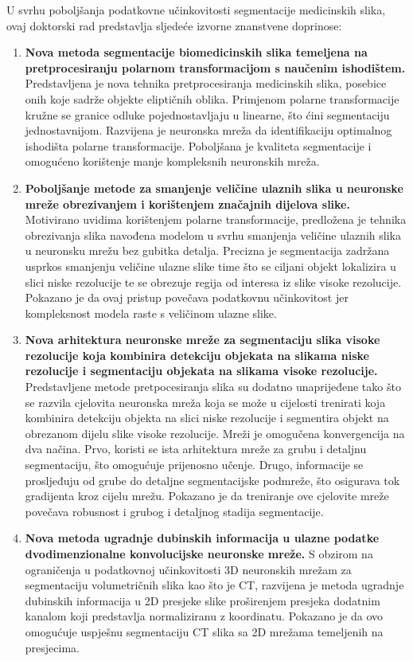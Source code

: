 U svrhu poboljšanja podatkovne učinkovitosti segmentacije medicinskih slika, ovaj doktorski rad predstavlja sljedeće izvorne znanstvene doprinose:

\begin{enumerate}
	\item \textbf{Nova metoda segmentacije biomedicinskih slika temeljena na pretprocesiranju polarnom transformacijom s naučenim ishodištem.} Predstavljena je nova tehnika pretprocesiranja medicinskih slika, posebice onih koje sadrže objekte eliptičnih oblika. Primjenom polarne transformacije kružne se granice odluke pojednostavljaju u linearne, što ćini segmentaciju jednostavnijom. Razvijena je neuronska mreža da identifikaciju optimalnog ishodišta polarne transformacije. Poboljšana je kvaliteta segmentacije i omogućeno korištenje manje kompleksnih neuronskih mreža.
	\item \textbf{Poboljšanje metode za smanjenje veličine ulaznih slika u neuronske mreže obrezivanjem i korištenjem značajnih dijelova slike.} Motivirano uvidima korištenjem polarne transformacije, predložena je tehnika obrezivanja slika navođena modelom u svrhu smanjenja veličine ulaznih slika u neuronsku mrežu bez gubitka detalja. Precizna je segmentacija zadržana usprkos smanjenju veličine ulazne slike time što se ciljani objekt lokalizira u slici niske rezolucije te se obrezuje regija od interesa iz slike visoke rezolucije. Pokazano je da ovaj pristup povečava podatkovnu učinkovitost jer kompleksnost modela raste s veličinom ulazne slike.
	\item \textbf{Nova arhitektura neuronske mreže za segmentaciju slika visoke rezolucije koja kombinira detekciju objekata na slikama niske rezolucije i segmentaciju objekata na slikama visoke rezolucije.} Predstavljene metode pretpocesiranja slika su dodatno unaprijeđene tako što se razvila cjelovita neuronska mreža koja se može u cijelosti trenirati koja kombinira detekciju objekta na slici niske rezolucije i segmentira objekt na obrezanom dijelu slike visoke rezolucije. Mreži je omogučena konvergencija na dva načina. Prvo, koristi se ista arhitektura mreže za grubu i detaljnu segmentaciju, što omogućuje prijenosno učenje. Drugo, informacije se prosljeđuju od grube do detaljne segmentacijske podmreže, što osigurava tok gradijenta kroz cijelu mrežu. Pokazano je da treniranje ove cjelovite mreže povečava robusnost i grubog i detaljnog stadija segmentacije.
	\item \textbf{Nova metoda ugradnje dubinskih informacija u ulazne podatke dvodimenzionalne konvolucijske neuronske mreže.} S obzirom na ograničenja u podatkovnoj učinkovitosti 3D neuronskih mrežam za segmentaciju volumetričnih slika kao što je CT, razvijena je metoda ugradnje dubinskih informacija u 2D presjeke slike proširenjem presjeka dodatnim kanalom koji predstavlja normaliziranu z koordinatu. Pokazano je da ovo omogućuje uspješnu segmentaciju CT slika sa 2D mrežama temeljenih na presjecima.
\end{enumerate}

